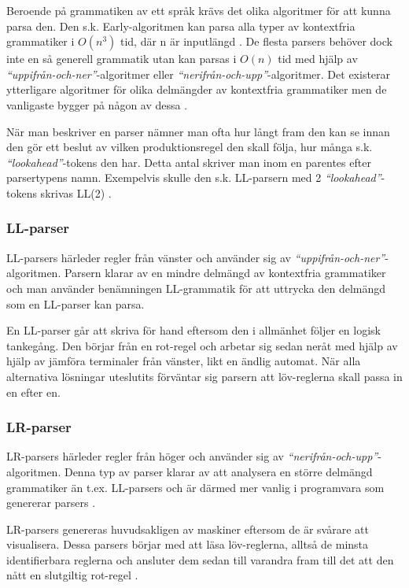 Beroende på grammatiken av ett språk krävs det olika algoritmer för att kunna
parsa den. Den s.k. Early-algoritmen kan parsa alla typer av kontextfria
grammatiker i $O(n^3)$ tid, där n är inputlängd \citep[s. 67]{sm09}. De
flesta parsers behöver dock inte en så generell grammatik utan kan parsas i
$O(n)$ tid med hjälp av \textit{``uppifrån-och-ner''}-algoritmer eller
\textit{``nerifrån-och-upp''}-algoritmer. Det existerar ytterligare algoritmer
för olika delmängder av kontextfria grammatiker men de vanligaste bygger på
någon av dessa \citep[s. 61]{aa06}.

När man beskriver en parser nämner man ofta hur långt fram den kan se innan
den gör ett beslut av vilken produktionsregel den skall följa, hur många s.k.
\textit{``lookahead''}-tokens den har. Detta antal skriver man inom en
parentes efter parsertypens namn. Exempelvis skulle den s.k. LL-parsern med 2
\textit{``lookahead''}-tokens skrivas LL(2) \citep[s. 69]{sm09}.

\subsubsection{LL-parser}

LL-parsers härleder regler från vänster och använder sig av
\textit{``uppifrån-och-ner''}-algoritmen. Parsern klarar av en mindre delmängd
av kontextfria grammatiker och man använder benämningen LL-grammatik för att
uttrycka den delmängd som en LL-parser kan parsa.

En LL-parser går att skriva för hand eftersom den i allmänhet följer en logisk
tankegång. Den börjar från en rot-regel och arbetar sig sedan neråt
med hjälp av hjälp av jämföra terminaler från vänster, likt en ändlig
automat. När alla alternativa lösningar uteslutits förväntar sig parsern att
löv-reglerna skall passa in en efter en.

\subsubsection{LR-parser}

LR-parsers härleder regler från höger och använder sig av
\textit{``nerifrån-och-upp''}-algoritmen. Denna typ av parser klarar av att
analysera en större delmängd grammatiker än t.ex. LL-parsers och är därmed mer
vanlig i programvara som genererar parsers \citep[s. 61]{aa06}.

LR-parsers genereras huvudsakligen av maskiner eftersom de är svårare att
visualisera. Dessa parsers börjar med att läsa löv-reglerna, alltså de minsta
identifierbara reglerna och ansluter dem sedan till varandra fram till det att
den nått en slutgiltig rot-regel \citep[s. 67]{sm09}.

